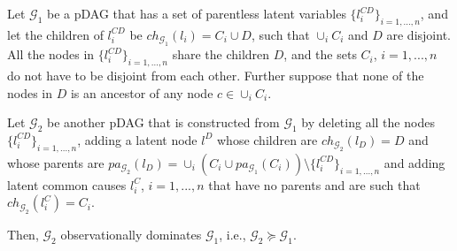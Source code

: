 \begin{lemma}
\label{lemma_dominance_bayesian_updating}
Let $\mathcal{G}_1$ be a pDAG that has a set of parentless latent variables $\{l^{CD}_i\}_{i=1,...,n}$, and let the children of $l^{CD}_i$ be $ch_{\mathcal{G}_1}(l_i)=C_i\cup D$, such that $\cup_i C_i$ and $D$ are disjoint. All the nodes in $\{l^{CD}_i\}_{i=1,...,n}$ share the children $D$, and the sets $C_i$, $i=1,...,n$ do not have to be disjoint from each other. Further suppose that none of the nodes in $D$ is an ancestor of any node $c\in \cup_i C_i$.

Let $\mathcal{G}_2$ be another pDAG that is constructed from ${\mathcal{G}_1}$ by deleting all the nodes $\{l^{CD}_i\}_{i=1,...,n}$, adding a latent node $l^D$ whose children are $ch_{\mathcal{G}_2}(l_D)=D$ and whose parents are $pa_{\mathcal{G}_2}(l_D)= \cup_i ( C_i\cup pa_{\mathcal{G}_1}(C_i) )\setminus \{l^{CD}_i\}_{i=1,...,n}$ and adding latent common causes $l^C_i$, $i=1,...,n$  that have no parents and are such that $ch_{\mathcal{G}_2}(l^{C}_i)=C_i$. 


Then, $\mathcal{G}_2$ observationally dominates $\mathcal{G}_1$, i.e., $\mathcal{G}_2 \succeq \mathcal{G}_1$.
\end{lemma}
